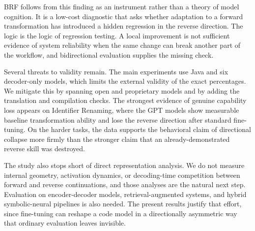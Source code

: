 BRF follows from this finding as an instrument rather than a theory of model
cognition. It is a low-cost diagnostic that asks whether adaptation to a forward
transformation has introduced a hidden regression in the reverse direction. The
logic is the logic of regression testing. A local improvement is not sufficient
evidence of system reliability when the same change can break another part of the
workflow, and bidirectional evaluation supplies the missing check.

Several threats to validity remain. The main experiments use Java and six
decoder-only models, which limits the external validity of the exact percentages.
We mitigate this by spanning open and proprietary models and by adding the
translation and compilation checks. The strongest evidence of genuine capability
loss appears on Identifier Renaming, where the GPT models show measurable
baseline transformation ability and lose the reverse direction after standard
fine-tuning. On the harder tasks, the data supports the behavioral claim of
directional collapse more firmly than the stronger claim that an
already-demonstrated reverse skill was destroyed.

The study also stops short of direct representation analysis. We do not measure
internal geometry, activation dynamics, or decoding-time competition between
forward and reverse continuations, and those analyses are the natural next step.
Evaluation on encoder-decoder models, retrieval-augmented systems, and hybrid
symbolic-neural pipelines is also needed. The present results justify that
effort, since fine-tuning can reshape a code model in a directionally asymmetric
way that ordinary evaluation leaves invisible.
